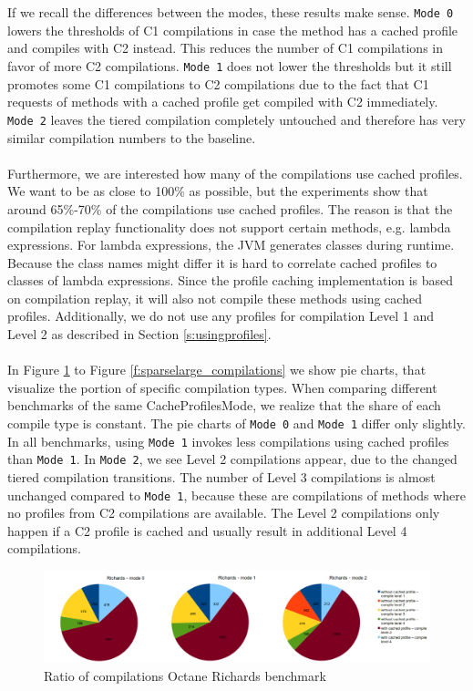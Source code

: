 \\\\
If we recall the differences between the modes, these results make sense. \texttt{Mode 0} lowers the thresholds of C1 compilations in case the method has a cached profile and compiles with C2 instead. This reduces the number of C1 compilations in favor of more C2 compilations. \texttt{Mode 1} does not lower the thresholds but it still promotes some C1 compilations to C2 compilations due to the fact that C1 requests of methods with a cached profile get compiled with C2 immediately.
\texttt{Mode 2} leaves the tiered compilation completely untouched and therefore has very similar compilation numbers to the baseline.
\\\\
Furthermore, we are interested how many of the compilations use cached profiles. We want to be as close to 100\% as possible, but the experiments show that around 65\%-70\% of the compilations use cached profiles.
The reason is that the compilation replay functionality does not support certain methods, e.g. lambda expressions. For lambda expressions, the JVM generates classes during runtime. Because the class names might differ it is hard to correlate cached profiles to classes of lambda expressions. Since the profile caching implementation is based on compilation replay, it will also not compile these methods using cached profiles. 
Additionally, we do not use any profiles for compilation Level 1 and Level 2 as described in Section \ref{s:usingprofiles}.
\\\\
In Figure \ref{f:richards_compilations} to Figure \ref{f:sparselarge_compilations} we show pie charts, that visualize the portion of specific compilation types.
When comparing different benchmarks of the same CacheProfilesMode, we realize that the share of each compile type is constant.
The pie charts of \texttt{Mode 0} and \texttt{Mode 1} differ only slightly. In all benchmarks, using \texttt{Mode 1} invokes less compilations using cached profiles than \texttt{Mode 1}.
In \texttt{Mode 2}, we see Level 2 compilations appear, due to the changed tiered compilation transitions. The number of Level 3 compilations is almost unchanged compared to \texttt{Mode 1}, because these are compilations of methods where no profiles from C2 compilations are available.
The Level 2 compilations only happen if a C2 profile is cached and usually result in additional Level 4 compilations. 
\begin{figure}[ht]
  \begin{center}
    \centering
    \includegraphics[width=1.0\textwidth]{figures/richards_compilations.png}
    \caption{Ratio of compilations Octane Richards benchmark}
    \label{f:richards_compilations}
  \end{center}
\end{figure}
